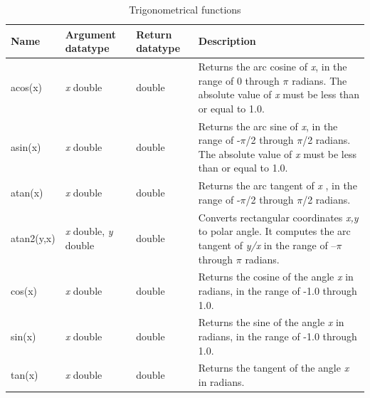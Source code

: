 \documentclass[11pt,a4paper]{ivoa}
\begin{document}
\begin{table}[tbh]\footnotesize
    \begin{tabular}{|p{}|p{}|p{}|p{}|}

        \hline
        \textbf{Name} &
        \textbf{Argument \newline datatype} &
        \textbf{Return \newline datatype} &
        \textbf{Description}
        \tabularnewline

        \hline
        acos(x) &
        \textit{x} double &
        double &
        Returns the arc cosine of \textit{x}, in the range of 0 through \(\pi\) radians. The absolute value of \textit{x} must be less than or equal to 1.0.
        \tabularnewline

        \hline
        asin(x) &
        \textit{x} double &
        double &
        Returns the arc sine of \textit{x}, in the range of -\(\pi\)/2 through \(\pi\)/2 radians. The absolute value of \textit{x} must be less than or equal to 1.0.
        \tabularnewline

        \hline
        atan(x) &
        \textit{x} double &
        double &
        Returns the arc tangent of \textit{x} , in the range of -\(\pi\)/2 through \(\pi\)/2 radians.
        \tabularnewline

        \hline
        atan2(y,x) &
        \textit{x} double,
        \newline
        \textit{y} double &
        double &
        Converts rectangular coordinates \textit{x,y} to polar angle. It computes the arc tangent of \textit{y/x} in the range of –\(\pi\) through \(\pi\) radians.
        \tabularnewline

        \hline
        cos(x) &
        \textit{x} double &
        double &
        Returns the cosine of the angle \textit{x} in radians, in the range of -1.0 through 1.0.
        \tabularnewline

        \hline
        sin(x) &
        \textit{x} double &
        double &
        Returns the sine of the angle \textit{x} in radians, in the range of -1.0 through 1.0.
        \tabularnewline

        \hline
        tan(x) &
        \textit{x} double &
        double &
        Returns the tangent of the angle \textit{x} in radians.
        \tabularnewline
        \hline
    \end{tabular}
    \caption{Trigonometrical functions}
    \label{table:trig.functions}
\end{table}
\end{document}
